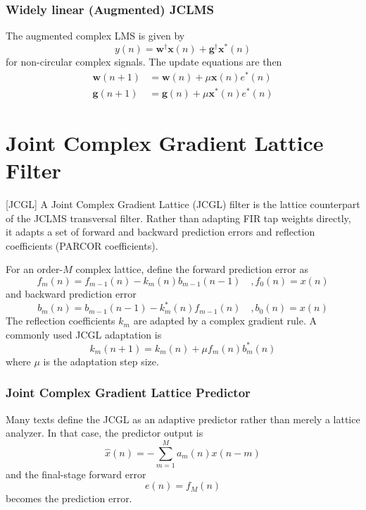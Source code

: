 \documentclass[11pt]{report}
\theoremstyle{example}
\begin{document}
\subsubsection{Widely linear (Augmented) JCLMS}
The augmented complex LMS is given by
\begin{equation}
	y(n)=\mathbf{w}^\dagger\mathbf{x}(n)+\mathbf{g}^\dagger\mathbf{x}^*(n)
\end{equation}
for non-circular complex signals. The update equations are then
\begin{align}
	\mathbf{w}(n+1)&=\mathbf{w}(n)+\mu\mathbf{x}(n)e^*(n)\\
	\mathbf{g}(n+1)&=\mathbf{g}(n)+\mu\mathbf{x}^*(n)e^*(n)
\end{align}

\section{Joint Complex Gradient Lattice Filter}[JCGL]
A Joint Complex Gradient Lattice (JCGL) filter is the lattice counterpart of the JCLMS transversal filter. Rather than adapting FIR tap weights directly, it adapts a set of forward and backward prediction errors and reflection coefficients (PARCOR coefficients).

For an order-$M$ complex lattice, define the forward prediction error as
\begin{equation}
	f_m(n)=f_{m-1}(n)-k_m(n)b_{m-1}(n-1)\quad,f_0(n)=x(n)
\end{equation}
and backward prediction error
\begin{equation}
	b_m(n)=b_{m-1}(n-1)-k_m^*(n)f_{m-1}(n)\quad,b_0(n)=x(n)
\end{equation}
The reflection coefficients $k_m$ are adapted by a complex gradient rule. A commonly used JCGL adaptation is
\begin{equation}
	k_m(n+1)=k_m(n)+\mu f_m(n)b_m^*(n)
\end{equation}
where $\mu$ is the adaptation step size.
\subsubsection{Joint Complex Gradient Lattice Predictor}
Many texts define the JCGL as an adaptive predictor rather than merely a lattice analyzer. In that case, the predictor output is
\begin{equation}
	\hat{x}(n)=-\sum_{m=1}^M{a_m(n)x(n-m)}
\end{equation}
and the final-stage forward error
\begin{equation}
	e(n)=f_M(n)
\end{equation}
becomes the prediction error.
\end{document}
